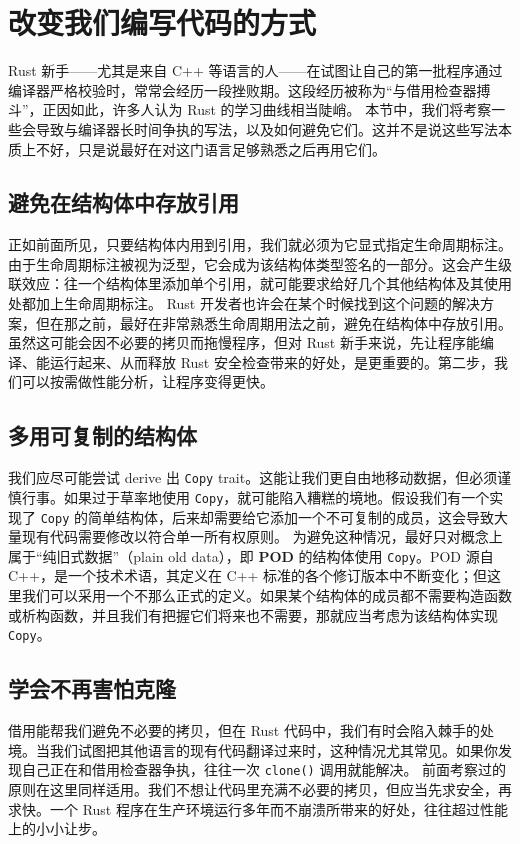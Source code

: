 \section{改变我们编写代码的方式}
Rust 新手——尤其是来自 C++ 等语言的人——在试图让自己的第一批程序通过编译器严格校验时，常常会经历一段挫败期。这段经历被称为“与借用检查器搏斗”，正因如此，许多人认为 Rust 的学习曲线相当陡峭。
本节中，我们将考察一些会导致与编译器长时间争执的写法，以及如何避免它们。这并不是说这些写法本质上不好，只是说最好在对这门语言足够熟悉之后再用它们。
\subsection{避免在结构体中存放引用}
\label{idx:idx_9f1a6d48}
正如前面所见，只要结构体内用到引用，我们就必须为它显式指定生命周期标注。由于生命周期标注被视为泛型，它会成为该结构体类型签名的一部分。这会产生级联效应：往一个结构体里添加单个引用，就可能要求给好几个其他结构体及其使用处都加上生命周期标注。
Rust 开发者也许会在某个时候找到这个问题的解决方案，但在那之前，最好在非常熟悉生命周期用法之前，避免在结构体中存放引用。虽然这可能会因不必要的拷贝而拖慢程序，但对 Rust 新手来说，先让程序能编译、能运行起来、从而释放 Rust 安全检查带来的好处，是更重要的。第二步，我们可以按需做性能分析，让程序变得更快。
\subsection{多用可复制的结构体}
\label{idx:idx_0e4b2459}
我们应尽可能尝试 derive 出 \texttt{Copy} trait。这能让我们更自由地移动数据，但必须谨慎行事。如果过于草率地使用 \texttt{Copy}，就可能陷入糟糕的境地。假设我们有一个实现了 \texttt{Copy} 的简单结构体，后来却需要给它添加一个不可复制的成员，这会导致大量现有代码需要修改以符合单一所有权原则。
\label{idx:idx_b84d3ff6}
\label{idx:idx_a34fd1ac}
为避免这种情况，最好只对概念上属于“纯旧式数据”（plain old data），即 \textbf{POD} 的结构体使用 \texttt{Copy}。POD 源自 C++，是一个技术术语，其定义在 C++ 标准的各个修订版本中不断变化；但这里我们可以采用一个不那么正式的定义。如果某个结构体的成员都不需要构造函数或析构函数，并且我们有把握它们将来也不需要，那就应当考虑为该结构体实现 \texttt{Copy}。
\subsection{学会不再害怕克隆}
\label{idx:idx_77701d5f}
借用能帮我们避免不必要的拷贝，但在 Rust 代码中，我们有时会陷入棘手的处境。当我们试图把其他语言的现有代码翻译过来时，这种情况尤其常见。如果你发现自己正在和借用检查器争执，往往一次 \texttt{clone()} 调用就能解决。
前面考察过的原则在这里同样适用。我们不想让代码里充满不必要的拷贝，但应当先求安全，再求快。一个 Rust 程序在生产环境运行多年而不崩溃所带来的好处，往往超过性能上的小小让步。
